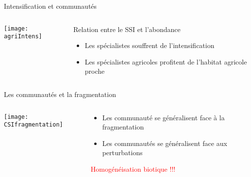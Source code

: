 \documentclass[10pt]{beamer}
\begin{document}
\begin{frame}{Intensification et communautés}
 \begin{columns}[c]
    \begin{column}[c]{0.45\textwidth}
      \begin{center}
          \texttt{[image: agriIntens]}
      \end{center}
    \end{column}
    \begin{column}[c]{0.55\textwidth}
     Relation entre le SSI et l'abondance
      \begin{itemize}[<+->]
      \item <2-> Les spécialistes souffrent de l'intensification
      \item <3> Les spécialistes agricoles profitent de l'habitat agricole proche
      \end{itemize}
        \begin{tiny}
   \cite{Filippi-Codaccioni2010}
  \end{tiny}
    \end{column}
  \end{columns}
\end{frame}


\begin{frame}{Les communautés et la fragmentation}
 \begin{columns}[c]
    \begin{column}[c]{0.4\textwidth}
      \begin{center}
     \texttt{[image: CSIfragmentation]}
      \end{center}
    \end{column}
    \begin{column}[c]{0.6\textwidth}
      \begin{itemize}[<+->]
      \item Les communauté se généralisent face à la fragmentation
      \item Les communautés se généralisent face aux perturbations
      \end{itemize}
       \begin{center}
   \textcolor{red}{Homogénéisation biotique !!!}
      \end{center}
        \begin{tiny}
    \cite{Devictor2008b}
  \end{tiny}
    \end{column}
  \end{columns}
\end{frame}
\end{document}

